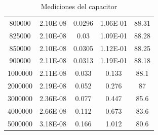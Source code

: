 \begin{table}[H]
{\begin{tabular}{ccccc}
            800000 & 2.10E-08 & 0.0296 & 1.06E-01 & 88.31 \\
            825000 & 2.10E-08 & 0.03 & 1.09E-01 & 88.28 \\
            850000 & 2.10E-08 & 0.0305 & 1.12E-01 & 88.25 \\
            900000 & 2.11E-08 & 0.0313 & 1.19E-01 & 88.18 \\
            1000000 & 2.11E-08 & 0.033 & 0.133 & 88.1 \\
            2000000 & 2.19E-08 & 0.052 & 0.276 & 87 \\
            3000000 & 2.36E-08 & 0.077 & 0.447 & 85.6 \\
            4000000 & 2.66E-08 & 0.112 & 0.673 & 83.6 \\
            5000000 & 3.18E-08 & 0.166 & 1.012 & 80.6 \\
             \hline
        \end{tabular}%
    }
    \caption{Mediciones del capacitor}
    \label{tab:Med_CAP}
\end{table}

